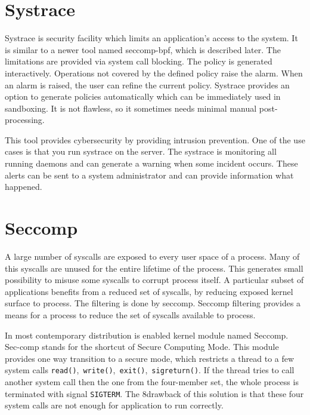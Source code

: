 \section{Systrace}
Systrace is security facility which limits an application's access to the system.
It is similar to a newer tool named seccomp-bpf, which is described later.
The limitations are provided via system call blocking.
The policy is generated interactively.
Operations not covered by the defined policy raise the alarm.
When an alarm is raised, the user can refine the current policy.
Systrace provides an option to generate policies automatically which can be immediately used in sandboxing.
It is not flawless, so it sometimes needs minimal manual post-processing.

This tool provides cybersecurity by providing intrusion prevention.
One of the use cases is that you run systrace on the server.
The systrace is monitoring all running daemons and can generate a warning when some incident occurs.
These alerts can be sent to a system administrator and can provide information what happened.

\section{Seccomp}
A large number of syscalls are exposed to every user space of a process.
Many of this syscalls are unused for the entire lifetime of the process.
This generates small possibility to misuse some syscalls to corrupt process itself.
A particular subset of applications benefits from a reduced set of syscalls, by reducing exposed kernel surface to process.
The filtering is done by seccomp.
Seccomp filtering provides a means for a process to reduce the set of syscalls available to process\cite{seccomp_kernel_doc}.

In most contemporary distribution is enabled kernel module named Seccomp\cite{seccomp_sandbox}.
Sec-comp stands for the shortcut of Secure Computing Mode.
This module provides one way transition to a secure mode, which restricts a thread to a few system calls \texttt{read()},\ \texttt{write()},\ \texttt{exit()},\ \texttt{sigreturn()}.
If the thread tries to call another system call then the one from the four-member set, the whole process is terminated with signal \texttt{SIGTERM}.
The 8drawback of this solution is that these four system calls are not enough for application to
run correctly.


